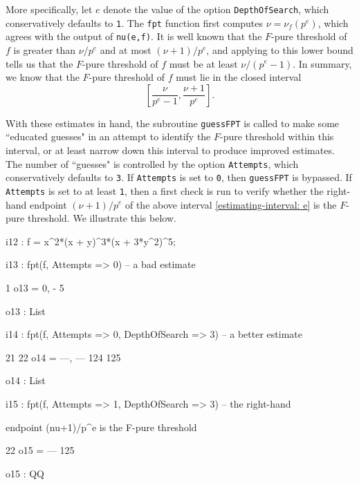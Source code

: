 \documentclass{amsart}
\begin{document}
More specifically, let $e$ denote the value of the option {\tt DepthOfSearch}, which conservatively defaults to {\tt 1}.  The {\tt fpt} function first computes $\nu=\nu_f(p^e)$, which agrees with the output of {\tt nu(e,f)}.  It is well known that the $F$-pure threshold of $f$ is greater than $\nu/p^e$ and at most $(\nu+1)/p^e$, and applying  \cite[Proposition 4.2]{HernandezFPurityOfHypersurfaces} to this lower bound tells us that the $F$-pure threshold of $f$ must be at least $\nu/(p^e-1)$.  In summary, we know that the $F$-pure threshold of $f$ must lie in the closed interval
%
\begin{equation}
\label{estimating-interval: e}
\tag{$\dagger$}
\left[ \frac{\nu}{p^e-1}, \frac{\nu+1}{p^e} \right].
\end{equation}

With these estimates in hand, the subroutine {\tt guessFPT} is called to make some ``educated guesses" in an attempt to identify the $F$-pure threshold within this interval, or at least narrow down this interval to produce improved estimates.  The number of ``guesses" is controlled by the option {\tt Attempts}, which conservatively defaults to {\tt 3}.  If {\tt Attempts} is set to {\tt 0}, then {\tt guessFPT} is bypassed. If  {\tt Attempts} is set to at least {\tt 1}, then a first check is run to verify whether the right-hand endpoint $(\nu+1)/p^e$ of the above interval \eqref{estimating-interval: e} is the $F$-pure threshold.  We illustrate this below.

{\small
{}
\begin{MyVerbatim}

i12 : f = x^2*(x + y)^3*(x + 3*y^2)^5;

i13 : fpt(f, Attempts => 0) -- a bad estimate

          1
o13 = {0, -}
          5

o13 : List

i14 : fpt(f, Attempts => 0, DepthOfSearch => 3) -- a better estimate

        21   22
o14 = {---, ---}
       124  125

o14 : List

i15 : fpt(f, Attempts => 1, DepthOfSearch => 3) -- the right-hand

      endpoint (nu+1)/p^e is the F-pure threshold

       22
o15 = ---
      125

o15 : QQ

\end{MyVerbatim}
}
\end{document}
